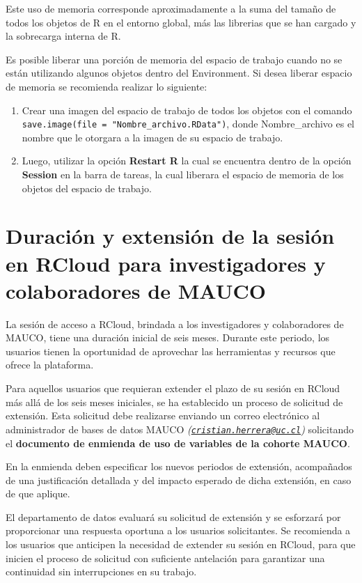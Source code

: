 \documentclass[
]{article}
\begin{document}
Este uso de memoria corresponde aproximadamente a la suma del tamaño de
todos los objetos de R en el entorno global, más las librerias que se
han cargado y la sobrecarga interna de R.

Es posible liberar una porción de memoria del espacio de trabajo cuando
no se están utilizando algunos objetos dentro del Environment. Si desea
liberar espacio de memoria se recomienda realizar lo siguiente:

\begin{enumerate}
\def\labelenumi{\arabic{enumi}.}
\item
  Crear una imagen del espacio de trabajo de todos los objetos con el
  comando \texttt{save.image(file\ =\ "Nombre\_archivo.RData")}, donde
  Nombre\_archivo es el nombre que le otorgara a la imagen de su espacio
  de trabajo.
\item
  Luego, utilizar la opción \textbf{Restart R} la cual se encuentra
  dentro de la opción \textbf{Session} en la barra de tareas, la cual
  liberara el espacio de memoria de los objetos del espacio de trabajo.
\end{enumerate}

\section{\texorpdfstring{\textbf{Duración y extensión de la sesión en
RCloud para investigadores y colaboradores de
MAUCO}}{Duración y extensión de la sesión en RCloud para investigadores y colaboradores de MAUCO}}\label{duraciuxf3n-y-extensiuxf3n-de-la-sesiuxf3n-en-rcloud-para-investigadores-y-colaboradores-de-mauco}

La sesión de acceso a RCloud, brindada a los investigadores y
colaboradores de MAUCO, tiene una duración inicial de seis meses.
Durante este periodo, los usuarios tienen la oportunidad de aprovechar
las herramientas y recursos que ofrece la plataforma.

Para aquellos usuarios que requieran extender el plazo de su sesión en
RCloud más allá de los seis meses iniciales, se ha establecido un
proceso de solicitud de extensión. Esta solicitud debe realizarse
enviando un correo electrónico al administrador de bases de datos MAUCO
\emph{(\href{mailto:cristian.herrera@uc.cl}{\nolinkurl{cristian.herrera@uc.cl}})}
solicitando el \textbf{documento de enmienda de uso de variables de la
cohorte MAUCO}.

En la enmienda deben especificar los nuevos periodos de extensión,
acompañados de una justificación detallada y del impacto esperado de
dicha extensión, en caso de que aplique.

El departamento de datos evaluará su solicitud de extensión y se
esforzará por proporcionar una respuesta oportuna a los usuarios
solicitantes. Se recomienda a los usuarios que anticipen la necesidad de
extender su sesión en RCloud, para que inicien el proceso de solicitud
con suficiente antelación para garantizar una continuidad sin
interrupciones en su trabajo.
\end{document}
